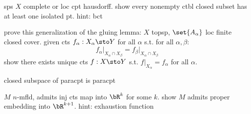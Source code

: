 \begin{exr}[source=Primary Source Material]
    sps $X$ complete or loc cpt hausdorff.
    show every nonempty ctbl closed subset has at least one isolated pt.
    hint: bct
\end{exr}

\begin{exr}[source=Primary Source Material]
    prove this generalization of the gluing lemma:
    $X$ topsp, $\set{A_{\alpha}}$ loc finite closed cover.
    given cts $f_{\alpha}:X_{\alpha}\sto Y$ for all $\alpha$ s.t.
    for all $\alpha,\beta$:
    \begin{equation*}
        f_{\alpha}\rvert_{X_{\alpha}\cap X_{\beta}} =
        f_{\beta}\rvert_{X_{\alpha}\cap X_{\beta}}
    \end{equation*}
    show there exists unique cts $f:X\sto Y$ s.t.
    $f\rvert_{X_{\alpha}}=f_{\alpha}$ for all $\alpha$.
\end{exr}

\begin{exr}[source=Primary Source Material]
    closed subspace of paracpt is paracpt
\end{exr}

\begin{exr}[source=Primary Source Material]
    $M$ $n$-mfld, admits inj cts map into $\bR^{k}$ for some $k$.
    show $M$ admits proper embedding into $\bR^{k+1}$.
    hint: exhaustion function
\end{exr}


